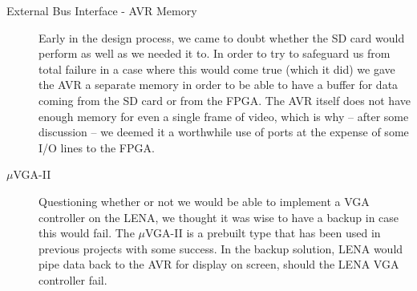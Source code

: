 \begin{description}
\item[External Bus Interface - AVR Memory]  \hfill 

Early in the design process, we came to doubt whether the \ac{SD} card would perform as well as we needed it to. In order to try to safeguard us from total failure in a case where this would come true (which it did) we gave the AVR a separate memory in order to be able to have a buffer for data coming from the \ac{SD} card or from the \ac{FPGA}. The AVR itself does not have enough memory for even a single frame of video, which is why -- after some discussion -- we deemed it a worthwhile use of ports at the expense of some \ac{I/O} lines to the FPGA.

\item[$\mu$VGA-II]  \hfill

Questioning whether or not we would be able to implement a \ac{VGA} controller
on the \ac{LENA}, we thought it was wise to have a backup in case this would fail. The $\mu$VGA-II is a prebuilt type that
has been used in previous projects with some success. In the backup solution, \ac{LENA} 
would pipe data back to the AVR for display on screen, should
the \ac{LENA} \ac{VGA} controller fail.

\end{description}
